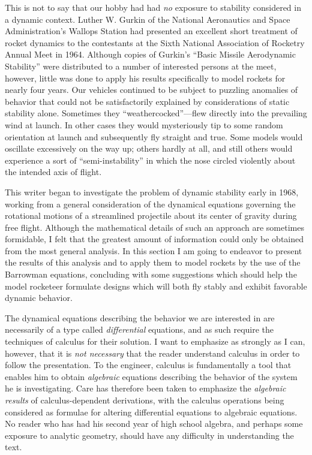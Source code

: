 This is not to say that our hobby had had \emph{no} exposure to stability
considered in a dynamic context. Luther W. Gurkin of the National Aeronautics
and Space Administration's Wallops Station had presented an excellent short
treatment of rocket dynamics to the contestants at the Sixth National
Association of Rocketry Annual Meet in 1964. Although copies of Gurkin's
``Basic Missile Aerodynamic Stability'' were distributed to a number of
interested persons at the meet, however, little was done to apply his results
specifically to model rockets for nearly four years. Our vehicles continued to
be subject to puzzling anomalies of behavior that could not be satisfactorily
explained by considerations of static stability alone. Sometimes they
``weathercocked''---flew directly into the prevailing wind at launch. In other
cases they would mysteriously tip to some random orientation at launch and
subsequently fly straight and true. Some models would oscillate excessively on
the way up; others hardly at all, and still others would experience a sort of
``semi-instability'' in which the nose circled violently about the intended
axis of flight.

This writer began to investigate the problem of dynamic stability early in
1968, working from a general consideration of the dynamical equations governing
the rotational motions of a streamlined projectile about its center of gravity
during free flight. Although the mathematical details of such an approach are
sometimes formidable, I felt that the greatest amount of information could only
be obtained from the most general analysis. In this section I am going to
endeavor to present the results of this analysis and to apply them to model
rockets by the use of the Barrowman equations, concluding with some suggestions
which should help the model rocketeer formulate designs which will both fly
stably and exhibit favorable dynamic behavior.

The dynamical equations describing the behavior we are interested in are
necessarily of a type called \emph{differential} equations, and as such require
the techniques of calculus for their solution. I want to emphasize as strongly
as I can, however, that it is \emph{not necessary} that the reader understand
calculus in order to follow the presentation. To the engineer, calculus is
fundamentally a tool that enables him to obtain \emph{algebraic} equations
describing the behavior of the system he is investigating. Care has therefore
been taken to emphasize the \emph{algebraic results} of calculus-dependent
derivations, with the calculus operations being considered as formulae for
altering differential equations to algebraic equations. No reader who has had
his second year of high school algebra, and perhaps some exposure to analytic
geometry, should have any difficulty in understanding the text.

